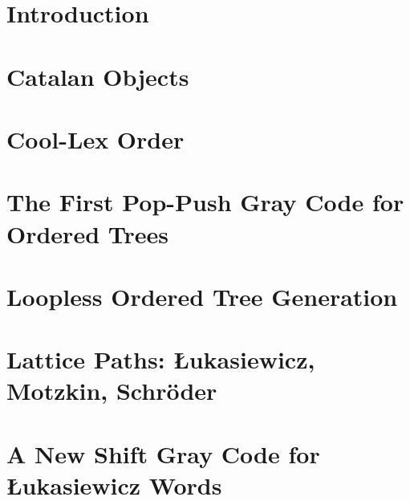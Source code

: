 


\maketitle
\tableofcontents




\chapter{Introduction}

\chapter{Catalan Objects} \label{chap:catalan}

\chapter{Cool-Lex Order}\label{chap:cool}


\chapter{The First Pop-Push Gray Code for Ordered Trees} \label{chap:otree-graycode}

\chapter{Loopless Ordered Tree Generation} \label{chap:otree-implementation}



\chapter{Lattice Paths: Łukasiewicz, Motzkin, Schröder}
 \label{chap:luka-background}

\chapter{A New Shift Gray Code for Łukasiewicz Words} \label{chap:luka-graycode}

